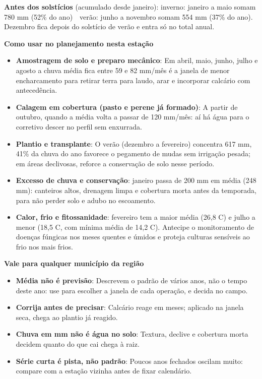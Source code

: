 \documentclass[10pt,a4paper]{article}
\begin{document}
\vspace{1pt}
{\footnotesize\textbf{Antes dos solstícios} (acumulado desde janeiro):
inverno: janeiro a maio somam 780 mm (52\% do ano) \,\textbullet\, verão: junho a novembro somam 554 mm (37\% do ano). Dezembro fica depois do solstício de verão e entra só no total
anual.}

\vspace{2pt}
{\bfseries\small Como usar no planejamento nesta estação}

\footnotesize\begin{itemize}\setlength{\itemsep}{0.5pt}
  \item \textbf{Amostragem de solo e preparo mecânico}: Em abril, maio, junho, julho e agosto a chuva média fica entre 59 e 82 mm/mês \textemdash{} é a janela de menor encharcamento para retirar terra para laudo, arar e incorporar calcário com antecedência.
  \item \textbf{Calagem em cobertura (pasto e perene já formado)}: A partir de outubro, quando a média volta a passar de 120 mm/mês: aí há água para o corretivo descer no perfil sem enxurrada.
  \item \textbf{Plantio e transplante}: O verão (dezembro a fevereiro) concentra 617 mm, 41\% da chuva do ano \textemdash{} favorece o pegamento de mudas sem irrigação pesada; em áreas declivosas, reforce a conservação de solo nesse período.
  \item \textbf{Excesso de chuva e conservação}: janeiro passa de 200 mm em média (248 mm): canteiros altos, drenagem limpa e cobertura morta antes da temporada, para não perder solo e adubo no escoamento.
  \item \textbf{Calor, frio e fitossanidade}: fevereiro tem a maior média (26,8 \textdegree{}C) e julho a menor (18,5 \textdegree{}C, com mínima média de 14,2 \textdegree{}C). Antecipe o monitoramento de doenças fúngicas nos meses quentes e úmidos e proteja culturas sensíveis ao frio nos mais frios.
\end{itemize}

\vspace{1pt}
{\bfseries\small Vale para qualquer município da região}

\scriptsize\begin{itemize}\setlength{\itemsep}{0.5pt}
  \item \textbf{Média não é previsão}: Descrevem o padrão de vários anos, não o tempo deste ano: use para escolher a janela de cada operação, e decida no campo.
  \item \textbf{Corrija antes de precisar}: Calcário reage em meses; aplicado na janela seca, chega ao plantio já reagido.
  \item \textbf{Chuva em mm não é água no solo}: Textura, declive e cobertura morta decidem quanto do que cai chega à raiz.
  \item \textbf{Série curta é pista, não padrão}: Poucos anos fechados oscilam muito: compare com a estação vizinha antes de fixar calendário.
\end{itemize}
\end{document}
